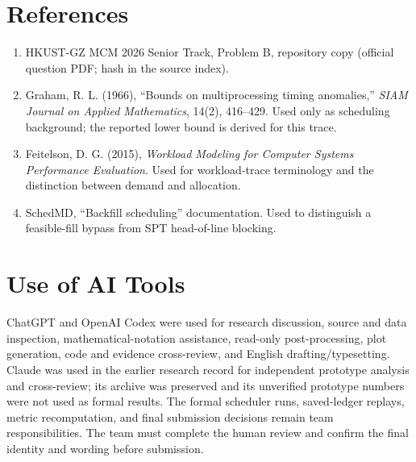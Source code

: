 \section*{References}
\begin{enumerate}
\item HKUST-GZ MCM 2026 Senior Track, Problem B, repository copy (official question PDF; hash in the source index).
\item Graham, R. L. (1966), ``Bounds on multiprocessing timing anomalies,'' \emph{SIAM Journal on Applied Mathematics}, 14(2), 416--429. Used only as scheduling background; the reported lower bound is derived for this trace.
\item Feitelson, D. G. (2015), \emph{Workload Modeling for Computer Systems Performance Evaluation}. Used for workload-trace terminology and the distinction between demand and allocation.
\item SchedMD, ``Backfill scheduling'' documentation. Used to distinguish a feasible-fill bypass from SPT head-of-line blocking.
\end{enumerate}

\section*{Use of AI Tools}
ChatGPT and OpenAI Codex were used for research discussion, source and data inspection, mathematical-notation assistance, read-only post-processing, plot generation, code and evidence cross-review, and English drafting/typesetting. Claude was used in the earlier research record for independent prototype analysis and cross-review; its archive was preserved and its unverified prototype numbers were not used as formal results. The formal scheduler runs, saved-ledger replays, metric recomputation, and final submission decisions remain team responsibilities. The team must complete the human review and confirm the final identity and wording before submission.

